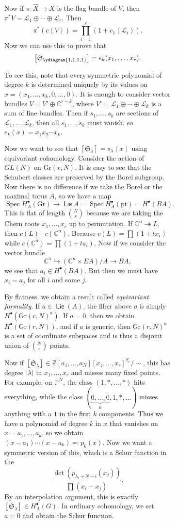 \documentclass[leqno, openany]{memoir}
\theoremstyle{definition}
\theoremstyle{remark}
\theoremstyle{plain}
\theoremstyle{definition}
\theoremstyle{remark}
\newcommand{\C}{\mathbb{C}}
\newcommand{\Z}{\mathbb{Z}}
\renewcommand{\P}{\mathbb{P}}
\newcommand{\mc}[1]{\mathcal{#1}}
\newcommand{\mf}[1]{\mathfrak{#1}}
\newcommand{\mr}[1]{\mathrm{#1}}
\newcommand{\wh}[1]{\widehat{#1}}
\DeclareMathOperator{\Spec}{Spec}
\DeclareMathOperator{\Lie}{\mathsf{Lie}}
\begin{document}
\begin{figure}[H]
\begin{figure}[H]
Now if $\pi \colon \wh{X} \to X$ is the flag bundle of $V$, then $\pi^* V =
\mc{L}_1 \oplus \cdots \oplus \mc{L}_r$. Then \[ \pi^*(c(V)) = \prod_{i=1}^r (1
    + c_1(\mc{L}_i)). \] Now we can use this to prove that \[
\qty[\mf{S}_{\tiny\ydiagram{1,1,1,1}}] = e_k(x_1, \ldots, x_r). \]

To see this, note that every symmetric polynomial of degree $k$ is determined
uniquely by its values on $x = (x_1, \ldots, x_k, 0, \ldots, 0)$. It is enough
to consider vector bundles $V = V' \oplus \C^{r-k}$, where $V' = \mc{L}_1
\oplus \cdots \oplus \mc{L}_k$ is a sum of line bundles. Then if $s_1, \ldots,
s_k$ are sections of $\mc{L}_1, \ldots, \mc{L}_k$, then all $s_1, \ldots, s_k$
must vanish, so $e_k(x) = x_1 x_2 \cdots x_k$.

Now we want to see that $[\mf{S}_{\lambda}] = s_{\lambda}(x)$ using equivariant
cohomology. Consider the action of $GL(N)$ on $\mr{Gr}(r, N)$. It is easy to
see that the Schubert classes are preserved by the Borel subgroup. Now there is
no difference if we take the Borel or the maximal torus $A$, so we have a map
\[ \Spec H_A^{\bullet}(\mr{Gr}) \to \Lie A = \Spec H_A^{\bullet}(\mr{pt}) =
H^{\bullet}(BA). \] This is flat of length $\binom{N}{r}$ because we are taking
the Chern roots $x_1, \ldots, x_r$ up to permutation. If $\C^n
\twoheadrightarrow L$, then $c(L) \mid c(\C^n)$. Because $c(L) = \prod (1+t
x_i)$ while $c(\C^n) = \prod (1+t a_i)$. Now if we consider the vector bundle
\[ \C^n \hookrightarrow (\C^n \times EA)/A \to BA ,\] we see that $a_i \in
H^{\bullet}(BA)$. But then we must have $x_i = a_j$ for all $i$ and some $j$.

By flatness, we obtain a result called \textit{equivariant formality}. If $a
\in \Lie(A)$, the fiber above $a$ is simply $H^{\bullet}({\mr{Gr}(r, N)}^a)$.
If $a = 0$, then we obtain $H^{\bullet}(\mr{Gr}(r, N))$, and if $a$ is generic,
then ${\mr{Gr}(r, N)}^a$ is a set of coordinate subspaces and is thus a
disjoint union of $\binom{N}{r}$ points. 

Now if $[\mf{S}_{\lambda}] \in { \Z[a_1, \ldots, a_N][x_1, \ldots, x_r] }^{S_r}
/ \sim$, this has degree $\abs{\lambda}$ in $x_1, \ldots, x_r$ and misses many
fixed points. For example, on $\P^N$, the class $(1,*,\ldots, *)$ hits
everything, while the class $(\underbrace{0, \ldots, 0}_k, 1, *, \ldots)$
misses anything with a $1$ in the first $k$ components. Thus we have a
polynomial of degree $k$ in $x$ that vanishes on $x = a_1, \ldots, a_k$, so we
obtain $(x - a_1) \cdots (x-a_k) \eqqcolon p_k(x)$. Now we want a symmetric
version of this, which is a Schur function in the \[ \frac{\det (p_{\lambda_i +
N - i}(x_j))}{\prod (x_i - x_j)}. \] By an interpolation argument, this is
exactly $[\mf{S}_{\lambda}] \in H_A^{\bullet}(G)$. In ordinary cohomology, we
set $a = 0$ and obtain the Schur function.


\end{figure}
\end{figure}
\end{document}
